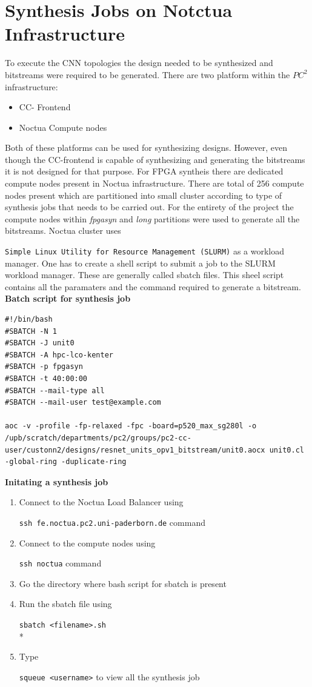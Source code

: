 \section{Synthesis Jobs on Notctua Infrastructure}
To execute the CNN topologies the design needed to be synthesized and bitstreams were required to be generated. There are two platform within the $PC^{2}$ infrastructure:
\begin{itemize}
    \item CC- Frontend
    \item Noctua Compute nodes
\end{itemize}
Both of these platforms can be used for synthesizing designs. However, even though the CC-frontend is capable of synthesizing and generating the bitstreams it is not designed for that purpose. For FPGA syntheis there are dedicated compute nodes present in Noctua infrastructure. There are total of 256 compute nodes present which are partitioned into small cluster according to type of synthesis jobs that needs to be carried out.
\newline
For the entirety of the project the compute nodes within \textit{fpgasyn} and \textit{long} partitions were used to generate all the bitstreams.
Noctua cluster uses \raggedright\texttt{Simple Linux Utility for Resource Management (SLURM)} as a workload manager. One has to create a shell script to submit a job to the SLURM workload manager. These are generally called sbatch files. This sheel script contains all the paramaters and the command required to generate a bitstream.
\newpage
\textbf{Batch script for synthesis job}
\begin{verbatim}
#!/bin/bash
#SBATCH -N 1
#SBATCH -J unit0
#SBATCH -A hpc-lco-kenter
#SBATCH -p fpgasyn
#SBATCH -t 40:00:00
#SBATCH --mail-type all
#SBATCH --mail-user test@example.com

aoc -v -profile -fp-relaxed -fpc -board=p520_max_sg280l -o /upb/scratch/departments/pc2/groups/pc2-cc-user/custonn2/designs/resnet_units_opv1_bitstream/unit0.aocx unit0.cl -global-ring -duplicate-ring 
\end{verbatim}
\textbf{Initating a synthesis job}
\begin{enumerate}
    \item Connect to the Noctua Load Balancer using \raggedright\texttt{ssh fe.noctua.pc2.uni-paderborn.de} command
    \item Connect to the compute nodes using \raggedright\texttt{ssh noctua} command
    \item Go the directory where bash script for sbatch is present
    \item Run the sbatch file using \raggedright\texttt{sbatch <filename>.sh} \\*
    \item Type \raggedright\texttt{squeue <username>} to view all the synthesis job
    
\end{enumerate}
